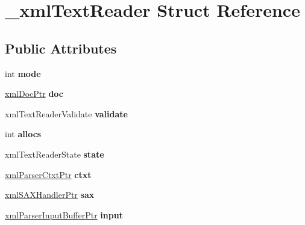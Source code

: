 \hypertarget{struct__xmlTextReader}{
\section{\_\-xmlTextReader Struct Reference}
\label{struct__xmlTextReader}
}
\subsection*{Public Attributes}
\begin{DoxyCompactItemize}
\item 
\hypertarget{struct__xmlTextReader_a4293e65382b239b47a9ad221a4e11f4d}{
int {\bfseries mode}}
\label{struct__xmlTextReader_a4293e65382b239b47a9ad221a4e11f4d}

\item 
\hypertarget{struct__xmlTextReader_a39a7b7ece9b2ecee9eda53351575799f}{
\hyperlink{struct__xmlDoc}{xmlDocPtr} {\bfseries doc}}
\label{struct__xmlTextReader_a39a7b7ece9b2ecee9eda53351575799f}

\item 
\hypertarget{struct__xmlTextReader_ad9822ca5c507be9dcec1f8252eef7e6b}{
xmlTextReaderValidate {\bfseries validate}}
\label{struct__xmlTextReader_ad9822ca5c507be9dcec1f8252eef7e6b}

\item 
\hypertarget{struct__xmlTextReader_a051f75b82ec78ab800dd60ed959a8fe9}{
int {\bfseries allocs}}
\label{struct__xmlTextReader_a051f75b82ec78ab800dd60ed959a8fe9}

\item 
\hypertarget{struct__xmlTextReader_a78a53eeedb2cdd23d64067834e2ce004}{
xmlTextReaderState {\bfseries state}}
\label{struct__xmlTextReader_a78a53eeedb2cdd23d64067834e2ce004}

\item 
\hypertarget{struct__xmlTextReader_a63b25eb1540902a826b2b5158d44ae64}{
\hyperlink{struct__xmlParserCtxt}{xmlParserCtxtPtr} {\bfseries ctxt}}
\label{struct__xmlTextReader_a63b25eb1540902a826b2b5158d44ae64}

\item 
\hypertarget{struct__xmlTextReader_a0cb7b409f23d75ff4b39f4465d67598a}{
\hyperlink{struct__xmlSAXHandler}{xmlSAXHandlerPtr} {\bfseries sax}}
\label{struct__xmlTextReader_a0cb7b409f23d75ff4b39f4465d67598a}

\item 
\hypertarget{struct__xmlTextReader_a218adaa17eb4544f35c957dddeef3415}{
\hyperlink{struct__xmlParserInputBuffer}{xmlParserInputBufferPtr} {\bfseries input}}
\label{struct__xmlTextReader_a218adaa17eb4544f35c957dddeef3415}


\end{DoxyCompactItemize}
